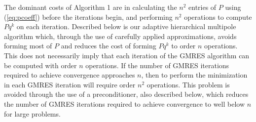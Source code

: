 The dominant costs of Algorithm 1 are in calculating the $ n^2 $
entries of $ P $ using (\ref{eq:pcoeff}) before the iterations begin,
and performing $n^2$ operations to compute $ P q^k $ on each
iteration.  Described below is our adaptive hierarchical multipole
algorithm which, through the use of carefully applied approximations,
avoids forming most of $ P $ and reduces the cost of forming $ P q^k $
to order $ n $ operations.  
This does not necessarily imply that each
iteration of the GMRES algorithm can be computed with order $ n $
operations.  If the number of GMRES iterations required to achieve
convergence approaches $ n $, then to perform the minimization in each
GMRES iteration will require order $ n^2 $ operations.  This problem
is avoided through the use of a preconditioner, also described below,
which reduces the number of GMRES iterations required to achieve
convergence to well below $ n $ for large problems.



